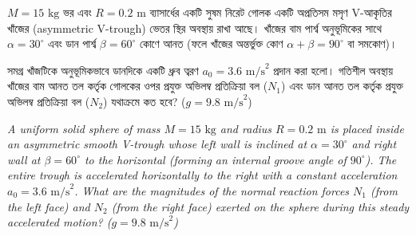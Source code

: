 \documentclass[12pt, a4paper]{article}
\begin{document}
\newpage

\begin{tcolorbox}[questionbox={প্রশ্ন (Question) 1}]
    \noindent
    $M = 15\text{ kg}$ ভর এবং $R = 0.2\text{ m}$ ব্যাসার্ধের একটি সুষম নিরেট গোলক একটি অপ্রতিসম মসৃণ V-আকৃতির খাঁজের (asymmetric V-trough) ভেতর স্থির অবস্থায় রাখা আছে। খাঁজের বাম পার্শ্ব অনুভূমিকের সাথে $\alpha = 30^\circ$ এবং ডান পার্শ্ব $\beta = 60^\circ$ কোণে আনত (ফলে খাঁজের অন্তর্ভুক্ত কোণ $\alpha + \beta = 90^\circ$ বা সমকোণ)। 
    
    সমগ্র খাঁজটিকে অনুভূমিকভাবে ডানদিকে একটি ধ্রুব ত্বরণ $a_0 = 3.6\text{ m/s}^2$ প্রদান করা হলো। গতিশীল অবস্থায় খাঁজের বাম আনত তল কর্তৃক গোলকের ওপর প্রযুক্ত অভিলম্ব প্রতিক্রিয়া বল ($N_1$) এবং ডান আনত তল কর্তৃক প্রযুক্ত অভিলম্ব প্রতিক্রিয়া বল ($N_2$) যথাক্রমে কত হবে? ($g = 9.8\text{ m/s}^2$)

    \vspace{0.8em}
    \begin{english}
    \noindent\textit{\color{darkgray}
    A uniform solid sphere of mass $M = 15\text{ kg}$ and radius $R = 0.2\text{ m}$ is placed inside an asymmetric smooth V-trough whose left wall is inclined at $\alpha = 30^\circ$ and right wall at $\beta = 60^\circ$ to the horizontal (forming an internal groove angle of $90^\circ$). The entire trough is accelerated horizontally to the right with a constant acceleration $a_0 = 3.6\text{ m/s}^2$. What are the magnitudes of the normal reaction forces $N_1$ (from the left face) and $N_2$ (from the right face) exerted on the sphere during this steady accelerated motion? ($g = 9.8\text{ m/s}^2$)
    }
    \end{english}
\end{tcolorbox}
\end{document}
